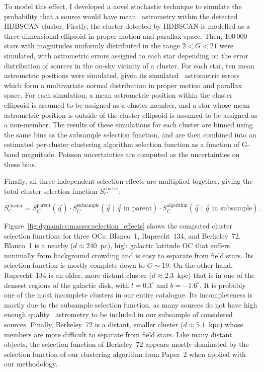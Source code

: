 To model this effect, I developed a novel stochastic technique to simulate the probability that a source would have mean \gaia\ astrometry within the detected HDBSCAN cluster. Firstly, the cluster detected by HDBSCAN is modelled as a three-dimensional ellipsoid in proper motion and parallax space. Then, 100\,000 stars with magnitudes uniformly distributed in the range $2 < G < 21$ were simulated, with astrometric errors assigned to each star depending on the error distribution of sources in the on-sky vicinity of a cluster. For each star, ten mean astrometric positions were simulated, given its simulated \gaia\ astrometric errors which form a multivariate normal distribution in proper motion and parallax space. For each simulation, a mean astrometric position within the cluster ellipsoid is assumed to be assigned as a cluster member, and a star whose mean astrometric position is outside of the cluster ellipsoid is assumed to be assigned as a non-member. The results of these simulations for each cluster are binned using the same bins as the subsample selection function, and are then combined into an estimated per-cluster clustering algorithm selection function as a function of G-band magnitude. Poisson uncertainties are computed as the uncertainties on these bins.

Finally, all three independent selection effects are multiplied together, giving the total cluster selection function $S_C^\text{cluster}$:

\begin{equation}
    S_C^\text{cluster} = 
    S_C^\text{parent}(\vec{q})
    \cdot
    S_C^\text{subsample}(\vec{q} \mid \vec{q}\text{ in parent})
    \cdot
    S_C^\text{algorithm}(\vec{q} \mid \vec{q}\text{ in subsample}).
    \label{eqn:dynamics:masses:selection_function}
\end{equation}

Figure~\ref{fig:dynamics:masses:selection_effects} shows the computed cluster selection functions for three OCs: Blanco~1, Ruprecht~134, and Berkeley~72. Blanco~1 is a nearby ($d\approx240$~pc), high galactic latitude OC that suffers minimally from background crowding and is easy to separate from field stars. Its selection function is mostly complete down to $G\sim19$. On the other hand, Ruprecht~134 is an older, more distant cluster ($d\approx2.3$~kpc) that is in one of the densest regions of the galactic disk, with $l=0.3^\circ$ and $b=-1.6^\circ$. It is probably one of the most incomplete clusters in our entire catalogue. Its incompleteness is mostly due to the subsample selection function, as many sources do not have high enough quality \gaia\ astrometry to be included in our subsample of considered sources. Finally, Berkeley~72 is a distant, smaller cluster ($d\approx5.1$~kpc) whose members are more difficult to separate from field stars. Like many distant objects, the selection function of Berkeley~72 appears mostly dominated by the selection function of our clustering algorithm from Paper~2 when applied with our methodology. 

